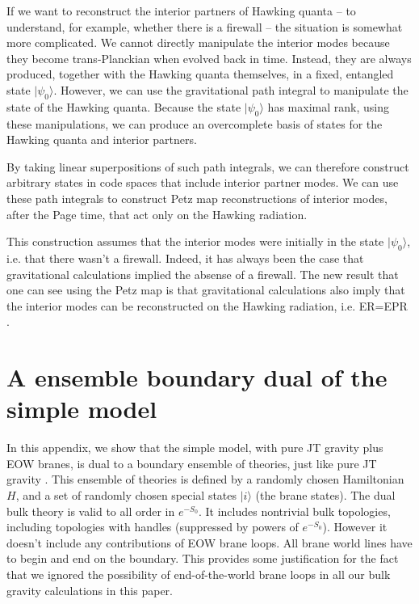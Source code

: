 \documentclass[11pt]{article}
\numberwithin{equation}{section}
\begin{document}
If we want to reconstruct the interior partners of Hawking quanta -- to understand, for example, whether there is a firewall \cite{Almheiri:2012rt} -- the situation is somewhat more complicated. We cannot directly manipulate the interior modes because they become trans-Planckian when evolved back in time. Instead, they are always produced, together with the Hawking quanta themselves, in a fixed, entangled state $|\psi_0\rangle$. However, we can use the gravitational path integral to manipulate the state of the Hawking quanta. Because the state $|\psi_0\rangle$ has maximal rank, using these manipulations, we can produce an overcomplete basis of states for the Hawking quanta and interior partners. 

By taking linear superpositions of such path integrals, we can therefore construct arbitrary states in code spaces that include interior partner modes. We can use these path integrals to construct Petz map reconstructions of interior modes, after the Page time, that act only on the Hawking radiation. 

This construction assumes that the interior modes were initially in the state $|\psi_0\rangle$, i.e. that there wasn't a firewall. Indeed, it has always been the case that gravitational calculations implied the absense of a firewall. The new result that one can see using the Petz map is that gravitational calculations also imply that the interior modes can be reconstructed on the Hawking radiation, i.e. ER=EPR \cite{Bousso:2012as,Nomura:2012sw,Verlinde:2012cy,Papadodimas:2012aq,Maldacena:2013xja}.

\section{A ensemble boundary dual of the simple model}\label{app:ensemble}
In this appendix, we show that the simple model, with pure JT gravity plus EOW branes, is dual to a boundary ensemble of theories, just like pure JT gravity \cite{Saad:2019lba}. This ensemble of theories is defined by a randomly chosen Hamiltonian $H$, and a set of randomly chosen special states $|i \rangle$ (the brane states). The dual bulk theory is valid to all order in $e^{-S_0}$. It includes nontrivial bulk topologies, including topologies with handles (suppressed by powers of $e^{-S_0}$). However it doesn't include any contributions of EOW brane loops. All brane world lines have to begin and end on the boundary. This provides some justification for the fact that we ignored the possibility of end-of-the-world brane loops in all our bulk gravity calculations in this paper.
\end{document}
